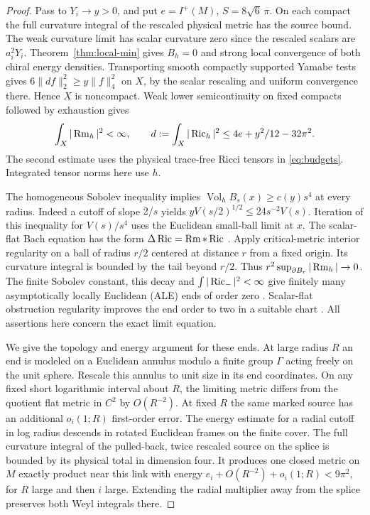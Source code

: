 \begin{proof}
Pass to \(Y_i\to y>0\), and put \(e=I^+(M)\), \(S=8\sqrt6\,\pi\).
On each compact the full curvature integral of the rescaled
physical metric has the source bound. The weak curvature limit
has scalar curvature zero since the rescaled scalars are \(a_i^2Y_i\).
Theorem~\ref{thm:local-min} gives \(B_h=0\) and strong local
convergence of both chiral energy densities.
Transporting smooth compactly supported Yamabe tests gives
\(6\|df\|_2^2\ge y\|f\|_4^2\) on \(X\), by the scalar rescaling
and uniform convergence there. Hence \(X\) is noncompact. Weak
lower semicontinuity on fixed compacts followed by exhaustion gives
\begin{equation}\label{eq:limit-ric-budget}
 \int_X|\operatorname{Rm}_h|^2<\infty,\qquad d:=\int_X|\operatorname{Ric}_h|^2
 \le 4e+y^2/12-32\pi^2 .
\end{equation}
The second estimate uses the physical trace-free Ricci tensors in
\eqref{eq:budgets}. Integrated tensor norms here use \(h\).

The homogeneous Sobolev inequality implies
\(\operatorname{Vol}_h B_s(x)\ge c(y)s^4\) at every radius.
Indeed a cutoff of slope \(2/s\) yields
\(yV(s/2)^{1/2}\le24s^{-2}V(s)\). Iteration of this inequality
for \(V(s)/s^4\) uses the Euclidean small-ball limit at \(x\).
The scalar-flat Bach equation has the form
\(\Delta\operatorname{Ric}=\operatorname{Rm}*\operatorname{Ric}\) \cite[\S2.1]{TianViaclovsky2004Moduli}.
Apply critical-metric interior regularity on a ball of radius
\(r/2\) centered at distance \(r\) from a fixed origin. Its
curvature integral is bounded by the tail beyond \(r/2\).
Thus \(r^2\sup_{\partial B_r}|\operatorname{Rm}_h|\to0\).
The finite Sobolev constant, this decay and
\(\int|\operatorname{Ric}_-|^2<\infty\) give finitely many asymptotically locally
Euclidean (ALE) ends of order zero
\cite[Theorems 1.2 and 1.1]{TianViaclovsky2008Volume}.
Scalar-flat obstruction regularity improves the end order to two
in a suitable chart \cite[Definition 1.1 and Theorem 1.2]{AcheViaclovsky2011Obstruction}.
All assertions here concern the exact limit equation.

We give the topology and energy argument for these ends. At large
radius \(R\) an end is modeled on a Euclidean annulus modulo a finite
group \(\Gamma\) acting freely on the unit sphere. Rescale this
annulus to unit size in its end coordinates. On any fixed short
logarithmic interval about \(R\), the limiting metric differs from
the quotient flat metric in \(C^2\) by \(O(R^{-2})\). At fixed \(R\)
the same marked source has an additional \(o_i(1;R)\) first-order
error. The energy estimate for a radial cutoff in log radius descends in rotated Euclidean frames
on the finite cover. The full curvature integral of the pulled-back, twice rescaled
source on the splice is bounded by its physical total in dimension four. It produces one closed metric on
\(M\) exactly product near this link with energy
\(e_i+O(R^{-2})+o_i(1;R)<9\pi^2\), for \(R\) large and then \(i\)
large. Extending the radial multiplier away from the splice preserves
both Weyl integrals there.


\end{proof}
